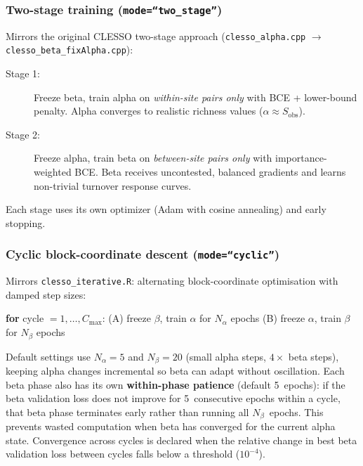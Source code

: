 \documentclass{article}
\begin{document}
\subsubsection{Two-stage training (\texttt{mode=``two\_stage''})}
\label{sec:two-stage}

Mirrors the original CLESSO two-stage approach (\texttt{clesso\_alpha.cpp} $\to$ \texttt{clesso\_beta\_fixAlpha.cpp}):

\begin{description}
    \item[Stage 1:] Freeze beta, train alpha on \textit{within-site pairs only} with BCE + lower-bound penalty. Alpha converges to realistic richness values ($\alpha \approx S_{\text{obs}}$).
    \item[Stage 2:] Freeze alpha, train beta on \textit{between-site pairs only} with importance-weighted BCE. Beta receives uncontested, balanced gradients and learns non-trivial turnover response curves.
\end{description}

Each stage uses its own optimizer (Adam with cosine annealing) and early stopping.

\subsubsection{Cyclic block-coordinate descent (\texttt{mode=``cyclic''})}
\label{sec:cyclic}

Mirrors \texttt{clesso\_iterative.R}: alternating block-coordinate optimisation with damped step sizes:

\begin{center}
\textbf{for} cycle $= 1, \ldots, C_{\max}$: \quad
(A) freeze $\beta$, train $\alpha$ for $N_\alpha$ epochs \quad
(B) freeze $\alpha$, train $\beta$ for $N_\beta$ epochs
\end{center}

Default settings use $N_\alpha = 5$ and $N_\beta = 20$ (small alpha steps, $4\times$ beta steps), keeping alpha changes incremental so beta can adapt without oscillation. Each beta phase also has its own \textbf{within-phase patience} (default 5~epochs): if the beta validation loss does not improve for 5~consecutive epochs within a cycle, that beta phase terminates early rather than running all $N_\beta$~epochs. This prevents wasted computation when beta has converged for the current alpha state. Convergence across cycles is declared when the relative change in best beta validation loss between cycles falls below a threshold ($10^{-4}$).
\end{document}
